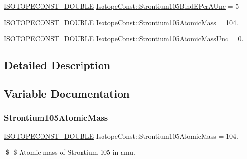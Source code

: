 \begin{DoxyCompactItemize}
\mbox{\hyperlink{group___isotope_const-_macros_ga8f45a7272ce02c0b4c65c44636ed719a}{I\+S\+O\+T\+O\+P\+E\+C\+O\+N\+S\+T\+\_\+\+D\+O\+U\+B\+LE}} \mbox{\hyperlink{group___isotope_const-_strontium-_sr105_ga06fc82790e1ec7b1654870713b344507}{Isotope\+Const\+::\+Strontium105\+Bind\+E\+Per\+A\+Unc}} = 5
\item 
\mbox{\hyperlink{group___isotope_const-_macros_ga8f45a7272ce02c0b4c65c44636ed719a}{I\+S\+O\+T\+O\+P\+E\+C\+O\+N\+S\+T\+\_\+\+D\+O\+U\+B\+LE}} \mbox{\hyperlink{group___isotope_const-_strontium-_sr105_ga95a50e42b8e8a2bbc5974b263cf6b180}{Isotope\+Const\+::\+Strontium105\+Atomic\+Mass}} = 104.
\item 
\mbox{\hyperlink{group___isotope_const-_macros_ga8f45a7272ce02c0b4c65c44636ed719a}{I\+S\+O\+T\+O\+P\+E\+C\+O\+N\+S\+T\+\_\+\+D\+O\+U\+B\+LE}} \mbox{\hyperlink{group___isotope_const-_strontium-_sr105_ga792fed37df0c71389a3f2b9cdd828c5e}{Isotope\+Const\+::\+Strontium105\+Atomic\+Mass\+Unc}} = 0.
\end{DoxyCompactItemize}


\subsection{Detailed Description}


\subsection{Variable Documentation}
\mbox{\label{group___isotope_const-_strontium-_sr105_ga95a50e42b8e8a2bbc5974b263cf6b180}} 
\subsubsection{\texorpdfstring{Strontium105\+Atomic\+Mass}{Strontium105AtomicMass}}
{\footnotesize\ttfamily \mbox{\hyperlink{group___isotope_const-_macros_ga8f45a7272ce02c0b4c65c44636ed719a}{I\+S\+O\+T\+O\+P\+E\+C\+O\+N\+S\+T\+\_\+\+D\+O\+U\+B\+LE}} Isotope\+Const\+::\+Strontium105\+Atomic\+Mass = 104.}

\$ \$ Atomic mass of Strontium-\/105 in amu. \mbox{\label{group___isotope_const-_strontium-_sr105_ga792fed37df0c71389a3f2b9cdd828c5e}} 
